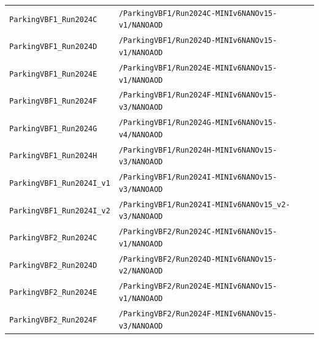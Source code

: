 \begin{longtable}{@{}>{\RaggedRight\arraybackslash}p{} >{\RaggedRight\arraybackslash}p{}@{}}
\addlinespace[2pt]
\texttt{ParkingVBF1\_\allowbreak{}Run2024C} & \texttt{/\allowbreak{}ParkingVBF1/\allowbreak{}Run2024C-\allowbreak{}MINIv6NANOv15-\allowbreak{}v1/\allowbreak{}NANOAOD} \\
\addlinespace[2pt]
\texttt{ParkingVBF1\_\allowbreak{}Run2024D} & \texttt{/\allowbreak{}ParkingVBF1/\allowbreak{}Run2024D-\allowbreak{}MINIv6NANOv15-\allowbreak{}v1/\allowbreak{}NANOAOD} \\
\addlinespace[2pt]
\texttt{ParkingVBF1\_\allowbreak{}Run2024E} & \texttt{/\allowbreak{}ParkingVBF1/\allowbreak{}Run2024E-\allowbreak{}MINIv6NANOv15-\allowbreak{}v1/\allowbreak{}NANOAOD} \\
\addlinespace[2pt]
\texttt{ParkingVBF1\_\allowbreak{}Run2024F} & \texttt{/\allowbreak{}ParkingVBF1/\allowbreak{}Run2024F-\allowbreak{}MINIv6NANOv15-\allowbreak{}v3/\allowbreak{}NANOAOD} \\
\addlinespace[2pt]
\texttt{ParkingVBF1\_\allowbreak{}Run2024G} & \texttt{/\allowbreak{}ParkingVBF1/\allowbreak{}Run2024G-\allowbreak{}MINIv6NANOv15-\allowbreak{}v4/\allowbreak{}NANOAOD} \\
\addlinespace[2pt]
\texttt{ParkingVBF1\_\allowbreak{}Run2024H} & \texttt{/\allowbreak{}ParkingVBF1/\allowbreak{}Run2024H-\allowbreak{}MINIv6NANOv15-\allowbreak{}v3/\allowbreak{}NANOAOD} \\
\addlinespace[2pt]
\texttt{ParkingVBF1\_\allowbreak{}Run2024I\_\allowbreak{}v1} & \texttt{/\allowbreak{}ParkingVBF1/\allowbreak{}Run2024I-\allowbreak{}MINIv6NANOv15-\allowbreak{}v3/\allowbreak{}NANOAOD} \\
\addlinespace[2pt]
\texttt{ParkingVBF1\_\allowbreak{}Run2024I\_\allowbreak{}v2} & \texttt{/\allowbreak{}ParkingVBF1/\allowbreak{}Run2024I-\allowbreak{}MINIv6NANOv15\_\allowbreak{}v2-\allowbreak{}v3/\allowbreak{}NANOAOD} \\
\addlinespace[2pt]
\texttt{ParkingVBF2\_\allowbreak{}Run2024C} & \texttt{/\allowbreak{}ParkingVBF2/\allowbreak{}Run2024C-\allowbreak{}MINIv6NANOv15-\allowbreak{}v1/\allowbreak{}NANOAOD} \\
\addlinespace[2pt]
\texttt{ParkingVBF2\_\allowbreak{}Run2024D} & \texttt{/\allowbreak{}ParkingVBF2/\allowbreak{}Run2024D-\allowbreak{}MINIv6NANOv15-\allowbreak{}v2/\allowbreak{}NANOAOD} \\
\addlinespace[2pt]
\texttt{ParkingVBF2\_\allowbreak{}Run2024E} & \texttt{/\allowbreak{}ParkingVBF2/\allowbreak{}Run2024E-\allowbreak{}MINIv6NANOv15-\allowbreak{}v1/\allowbreak{}NANOAOD} \\
\addlinespace[2pt]
\texttt{ParkingVBF2\_\allowbreak{}Run2024F} & \texttt{/\allowbreak{}ParkingVBF2/\allowbreak{}Run2024F-\allowbreak{}MINIv6NANOv15-\allowbreak{}v3/\allowbreak{}NANOAOD} \\

\end{longtable}
